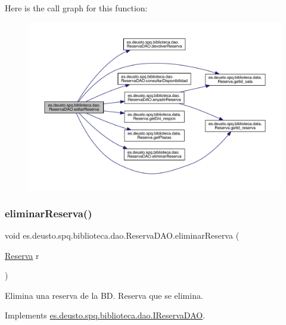 Here is the call graph for this function\+:
\nopagebreak
\begin{figure}[H]
\begin{center}
\leavevmode
\includegraphics[width=350pt]{classes_1_1deusto_1_1spq_1_1biblioteca_1_1dao_1_1_reserva_d_a_o_a88e9785413691dee23241ef307b4e93d_cgraph}
\end{center}
\end{figure}
\mbox{\label{classes_1_1deusto_1_1spq_1_1biblioteca_1_1dao_1_1_reserva_d_a_o_a82fb1dbc3f6715103dea1b3bfb3d66b0}} 
\subsubsection{\texorpdfstring{eliminar\+Reserva()}{eliminarReserva()}}
{\footnotesize\ttfamily void es.\+deusto.\+spq.\+biblioteca.\+dao.\+Reserva\+D\+A\+O.\+eliminar\+Reserva (\begin{DoxyParamCaption}\item[{\mbox{\hyperlink{classes_1_1deusto_1_1spq_1_1biblioteca_1_1data_1_1_reserva}{Reserva}}}]{r }\end{DoxyParamCaption})}

Elimina una reserva de la BD.  Reserva que se elimina. 

Implements \mbox{\hyperlink{interfacees_1_1deusto_1_1spq_1_1biblioteca_1_1dao_1_1_i_reserva_d_a_o_a696cce84b9719e9e858eec9064daa72f}{es.\+deusto.\+spq.\+biblioteca.\+dao.\+I\+Reserva\+D\+AO}}.



